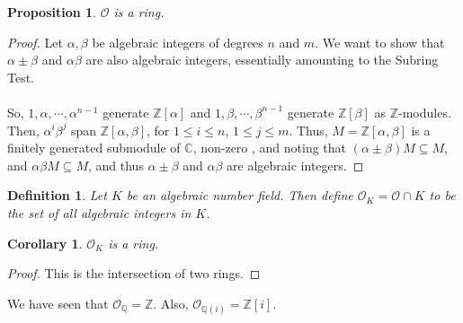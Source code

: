 \documentclass{article}
\newcommand{\C}{\mathbb{C}}
\newcommand{\Q}{\mathbb{Q}}
\newcommand{\Z}{\mathbb{Z}}
\newtheorem{cor}{Corollary}[subsection]
\newtheorem{proposition}{Proposition}[subsection]
\newtheorem{definition}{Definition}[subsection]
\begin{document}
\begin{proposition}
$\mathcal{O}$ is a ring.
\end{proposition}
\begin{proof}
Let $\alpha,\beta$ be algebraic integers of degrees $n$ and $m$. We want to show that $\alpha\pm \beta$ and $\alpha\beta$ are also algebraic integers, essentially amounting to the Subring Test. \\
\\
So, $1,\alpha,\cdots, \alpha^{n-1}$ generate $\Z[\alpha]$ and $1,\beta,\cdots, \beta^{n-1}$ generate $\Z[\beta]$ as $\Z$-modules. Then, $\alpha^i\beta^j$ span $\Z[\alpha,\beta]$, for $1\leq i\leq n$, $1\leq j\leq m$. Thus, $M=\Z[\alpha,\beta]$ is a finitely generated submodule of $\C$, non-zero , and noting that $(\alpha\pm \beta)M\subseteq M$, and $\alpha\beta M\subseteq M$, and thus $\alpha\pm \beta$ and $\alpha\beta$ are algebraic integers.
\end{proof}
\begin{definition}
Let $K$ be an algebraic number field. Then define $\mathcal{O}_K=\mathcal{O}\cap K$ to be the set of all algebraic integers in $K$.
\end{definition}
\begin{cor}
$\mathcal{O}_K$ is a ring.
\end{cor}
\begin{proof}
This is the intersection of two rings.
\end{proof}
\noindent We have seen that $\mathcal{O}_\Q = \Z$. Also, $\mathcal{O}_{\Q(i)}=\Z[i]$.
\newpage
\end{document}
